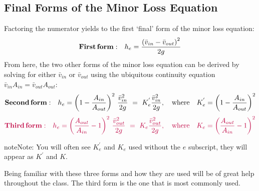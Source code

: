 \documentclass[letterpaper,10pt,english]{sphinxmanual}
\begin{document}
\subsection{Final Forms of the Minor Loss Equation}
\label{\detokenize{Review/Review_Fluid_Mechanics_Derivations:final-forms-of-the-minor-loss-equation}}\label{\detokenize{Review/Review_Fluid_Mechanics_Derivations:heading-final-minor-loss-equations}}
Factoring the numerator yields to the first ‘final’ form of the minor loss equation:
\begin{equation}\label{equation:Review/Review_Fluid_Mechanics_Derivations:Review/Review_Fluid_Mechanics_Derivations:12}
\begin{split}{\rm{ \mathbf{First \, form:} }} \quad h_e = \frac{\left( \bar v_{in}  - \bar v_{out} \right)^2}{2g}\end{split}
\end{equation}
From here, the two other forms of the minor loss equation can be derived by solving for either \(\bar v_{in}\) or \(\bar v_{out}\) using the ubiquitous continuity equation \(\bar v_{in} A_{in} = \bar v_{out} A_{out}\):
\begin{equation}\label{equation:Review/Review_Fluid_Mechanics_Derivations:Review/Review_Fluid_Mechanics_Derivations:13}
\begin{split}{\rm{ \mathbf{Second \, form:} }} \quad h_e = \left( 1 - \frac{A_{in}}{A_{out}} \right)^2 \, \frac{\bar v_{in}^2}{2g} \, \, = \, \, K_e^{'} \frac{\bar v_{in}^2}{2g}, \quad {\rm where} \quad K_e^{'} = \left( 1 - \frac{A_{in}}{A_{out}} \right)^2\end{split}
\end{equation}\begin{equation}\label{equation:Review/Review_Fluid_Mechanics_Derivations:minor_loss_equation}
\begin{split}   \color{purple}{
   {\rm{ \mathbf{Third \, form:} }} \quad h_e = \left( \frac{A_{out}}{A_{in}} -1 \right)^2 \, \frac{\bar  v_{out}^2}{2g} \, \, = \, \, K_e \frac{\bar v_{out}^2}{2g}, \quad {\rm where} \quad K_e = \left( \frac{A_{out}}{A_{in}} - 1 \right)^2
   }\end{split}
\end{equation}
\begin{sphinxadmonition}{note}{Note:}
You will often see \(K_e^{'}\) and \(K_e\) used without the \(e\) subscript, they will appear as \(K^{'}\) and \(K\).
\end{sphinxadmonition}

Being familiar with these three forms and how they are used will be of great help throughout the class. The third form is the one that is most commonly used.
\end{document}
